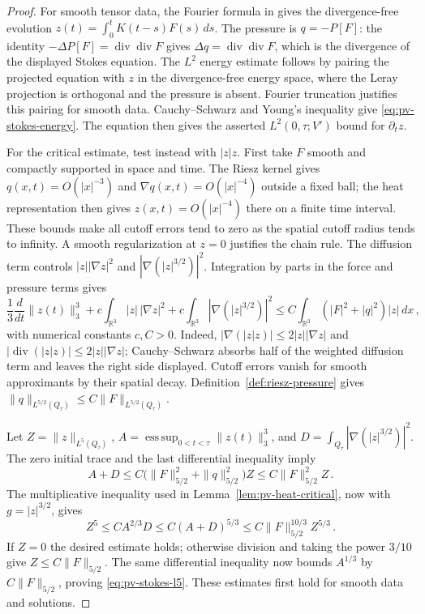 \documentclass[11pt,letterpaper]{article}
\numberwithin{equation}{section}
\theoremstyle{plain}
\theoremstyle{definition}
\theoremstyle{remark}
\begin{document}
\begin{proof}
For smooth tensor data, the Fourier formula in \cite[(168)]{CKNLean} gives the divergence-free evolution $z(t)=\int_0^t K(t-s)F(s)\,ds$. The pressure is $q=-P[F]$: the identity $-\Delta P[F]=\operatorname{div}\operatorname{div}F$ gives $\Delta q=\operatorname{div}\operatorname{div}F$, which is the divergence of the displayed Stokes equation. The $L^2$ energy estimate follows by pairing the projected equation with $z$ in the divergence-free energy space, where the Leray projection is orthogonal and the pressure is absent. Fourier truncation justifies this pairing for smooth data. Cauchy--Schwarz and Young's inequality give \eqref{eq:pv-stokes-energy}. The equation then gives the asserted $L^2(0,\tau;V')$ bound for $\partial_tz$.

For the critical estimate, test instead with $|z|z$. First take $F$ smooth and compactly supported in space and time. The Riesz kernel gives $q(x,t)=O(|x|^{-3})$ and $\nabla q(x,t)=O(|x|^{-4})$ outside a fixed ball; the heat representation then gives $z(x,t)=O(|x|^{-4})$ there on a finite time interval. These bounds make all cutoff errors tend to zero as the spatial cutoff radius tends to infinity. A smooth regularization at $z=0$ justifies the chain rule. The diffusion term controls $|z||\nabla z|^2$ and $|\nabla(|z|^{3/2})|^2$. Integration by parts in the force and pressure terms gives
\begin{equation*}
\frac13\frac{d}{dt}\|z(t)\|_3^3+c\int_{\mathbb R^3}|z|\,|\nabla z|^2+c\int_{\mathbb R^3}|\nabla(|z|^{3/2})|^2
 \le C\int_{\mathbb R^3}(|F|^2+|q|^2)|z|\,dx\,,
\end{equation*}
with numerical constants $c,C>0$. Indeed, $|\nabla(|z|z)|\le2|z||\nabla z|$ and $|\operatorname{div}(|z|z)|\le2|z||\nabla z|$; Cauchy--Schwarz absorbs half of the weighted diffusion term and leaves the right side displayed. Cutoff errors vanish for smooth approximants by their spatial decay. Definition~\ref{def:riesz-pressure} gives $\|q\|_{L^{5/2}(Q_\tau)}\le C\|F\|_{L^{5/2}(Q_\tau)}$.

Let $Z=\|z\|_{L^5(Q_\tau)}$, $A=\operatorname*{ess\,sup}_{0<t<\tau}\|z(t)\|_3^3$, and $D=\int_{Q_\tau}|\nabla(|z|^{3/2})|^2$. The zero initial trace and the last differential inequality imply
\begin{equation*}
A+D\le C\bigl(\|F\|_{5/2}^2+\|q\|_{5/2}^2\bigr)Z\le C\|F\|_{5/2}^2Z\,.
\end{equation*}
The multiplicative inequality used in Lemma~\ref{lem:pv-heat-critical}, now with $g=|z|^{3/2}$, gives
\begin{equation*}
Z^5\le C A^{2/3}D\le C(A+D)^{5/3}\le C\|F\|_{5/2}^{10/3}Z^{5/3}\,.
\end{equation*}
If $Z=0$ the desired estimate holds; otherwise division and taking the power $3/10$ give $Z\le C\|F\|_{5/2}$. The same differential inequality now bounds $A^{1/3}$ by $C\|F\|_{5/2}$, proving \eqref{eq:pv-stokes-l5}. These estimates first hold for smooth data and solutions.


\end{proof}
\end{document}
